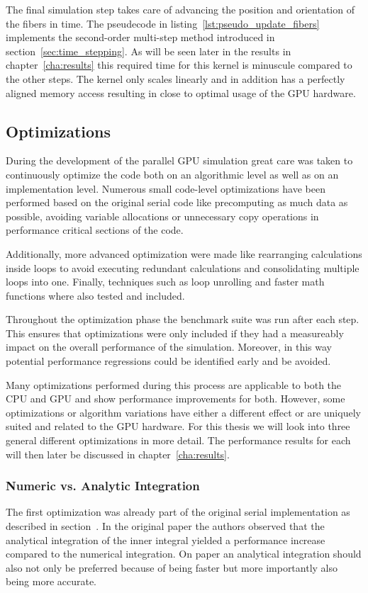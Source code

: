 \documentclass[a4paper,11pt]{kth-mag}
\begin{document}
The final simulation step takes care of advancing the position and orientation of the fibers in time. The pseudecode in listing~\ref{lst:pseudo_update_fibers} implements the second-order multi-step method introduced in section~\ref{sec:time_stepping}. As will be seen later in the results in chapter~\ref{cha:results} this required time for this kernel is minuscule compared to the other steps. The kernel only scales linearly and in addition has a perfectly aligned memory access resulting in close to optimal usage of the GPU hardware.

\subsection{Optimizations}
\label{subsec:optimizations}

During the development of the parallel GPU simulation great care was taken to continuously optimize the code both on an algorithmic level as well as on an implementation level. Numerous small code-level optimizations have been performed based on the original serial code like precomputing as much data as possible, avoiding variable allocations or unnecessary copy operations in performance critical sections of the code.

Additionally, more advanced optimization were made like rearranging calculations inside loops to avoid executing redundant calculations and consolidating multiple loops into one. Finally, techniques such as loop unrolling and faster math functions where also tested and included.

Throughout the optimization phase the benchmark suite was run after each step. This ensures that optimizations were only included if they had a measureably impact on the overall performance of the simulation. Moreover, in this way potential performance regressions could be identified early and be avoided.

Many optimizations performed during this process are applicable to both the CPU and GPU and show performance improvements for both. However, some optimizations or algorithm variations have either a different effect or are uniquely suited and related to the GPU hardware. For this thesis we will look into three general different optimizations in more detail. The performance results for each will then later be discussed in chapter~\ref{cha:results}.

\subsubsection{Numeric vs. Analytic Integration}
\label{subsubsec:numeric_analytic}
The first optimization was already part of the original serial implementation as described in section~\label{sec:quadrature}. In the original paper \cite{} the authors observed that the analytical integration of the inner integral yielded a performance increase compared to the numerical integration. On paper an analytical integration should also not only be preferred because of being faster but more importantly also being more accurate.
\end{document}
